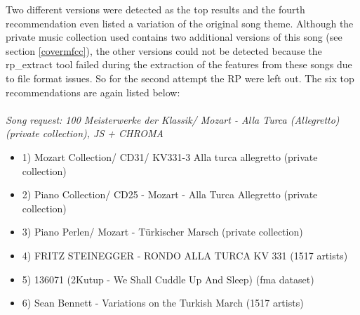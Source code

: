 \noindent Two different versions were detected as the top results and the fourth recommendation even listed a variation of the original song theme. Although the private music collection used contains two additional versions of this song (see section \ref{covermfcc}), the other versions could not be detected because the rp\_extract tool failed during the extraction of the features from these songs due to file format issues. So for the second attempt the RP were left out. The six top recommendations are again listed below:\\
\ \\
\textit{\noindent Song request: 100 Meisterwerke der Klassik/ Mozart - Alla Turca (Allegretto) (private collection), JS + CHROMA}

\begin{itemize}
	\setlength\itemsep{-0.5em}
	\item 1) Mozart Collection/ CD31/ KV331-3 Alla turca allegretto (private collection)
	\item 2) Piano Collection/ CD25 - Mozart - Alla Turca Allegretto (private collection)
	\item 3) Piano Perlen/ Mozart - Türkischer Marsch (private collection)
	\item 4) FRITZ STEINEGGER - RONDO ALLA TURCA KV 331 (1517 artists)
	\item 5) 136071 (2Kutup - We Shall Cuddle Up And Sleep) (fma dataset) 
	\item 6) Sean Bennett - Variations on the Turkish March (1517 artists)
\end{itemize}

